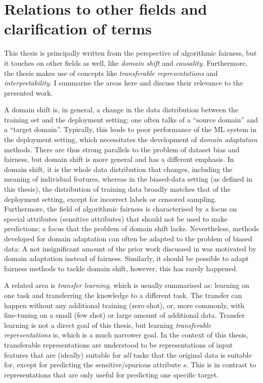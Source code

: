 \section{Relations to other fields and clarification of terms}
This thesis is principally written from the perspective of algorithmic fairness,
but it touches on other fields as well, like \emph{domain shift} and \emph{causality}.
Furthermore, the thesis makes use of concepts like \emph{transferable representations}
and \emph{interpretability}.
I summarise the areas here and discuss their relevance to the presented work.

A domain shift is, in general, a change in the data distribution between the training set and the deployment setting;
one often talks of a ``source domain'' and a ``target domain''.
Typically, this leads to poor performance of the \ac{ML} system in the deployment setting,
which necessitates the development of \emph{domain adaptation} methods.
There are thus strong parallels to the problem of dataset bias and fairness,
but domain shift is more general and has a different emphasis.
In domain shift, it is the whole data distribution that changes, including the meaning of individual features,
whereas in the biased-data setting (as defined in this thesis), the distribution of training data broadly matches that of the deployment setting, except for incorrect labels or censored sampling.
Furthermore, the field of algorithmic fairness is characterised by a focus on special attributes (sensitive attributes) that should not be used to make predictions;
a focus that the problem of domain shift lacks.
Nevertheless, methods developed for domain adaptation can often be adapted to the problem of biased data:
A not insignificant amount of the prior work discussed in  was motivated by domain adaptation instead of fairness.
Similarly, it should be possible to adapt fairness methods to tackle domain shift,
however, this has rarely happened.

A related area is \emph{transfer learning},
which is usually summarised as:
learning on one task and transferring the knowledge to a different task.
The transfer can happen without any additional training (zero shot),
or, more commonly, with fine-tuning on a small (few shot) or large amount of additional data.
Transfer learning is not a direct goal of this thesis,
but learning \emph{transferable representations} is,
which is a much narrower goal.
In the context of this thesis,
transferable representations are understood to be representations of input features
that are (ideally) suitable for \emph{all} tasks that the original data is suitable for,
except for predicting the sensitive\slash spurious attribute \(s\).
This is in contrast to representations that are only useful for predicting one specific target.

